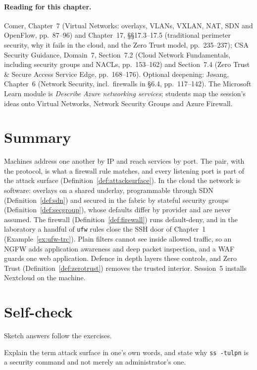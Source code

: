\paragraph{Reading for this chapter.} Comer, Chapter~7 (Virtual Networks:
overlays, VLANs, VXLAN, NAT, SDN and OpenFlow, pp.~87--96) and Chapter~17,
\S\S17.3--17.5 (traditional perimeter security, why it fails in the cloud, and
the Zero Trust model, pp.~235--237); CSA Security Guidance, Domain~7,
Section~7.2 (Cloud Network Fundamentals, including security groups and NACLs,
pp.~153--162) and Section~7.4 (Zero Trust \& Secure Access Service Edge,
pp.~168--176). Optional deepening: J\o sang, Chapter~6 (Network Security, incl.\ firewalls in \S6.4, pp.~117--142). The
Microsoft Learn module is \emph{Describe Azure networking services}; students
map the session's ideas onto Virtual Networks, Network Security Groups and
Azure Firewall.

\section{Summary}

Machines address one another by IP and reach services by port. The pair,
with the protocol, is what a firewall rule matches, and every listening port
is part of the attack surface (Definition~\ref{def:attacksurface}). In the
cloud the network is software: overlays on a shared underlay, programmable
through SDN (Definition~\ref{def:sdn}) and secured in the fabric by stateful
security groups (Definition~\ref{def:secgroup}), whose defaults differ by
provider and are never assumed. The firewall (Definition~\ref{def:firewall})
runs default-deny, and in the laboratory a handful of \texttt{ufw} rules
close the SSH door of Chapter~1 (Example~\ref{ex:ufw-trc}). Plain filters
cannot see inside allowed traffic, so an NGFW adds application awareness and
deep packet inspection, and a WAF guards one web application. Defence in
depth layers these controls, and Zero Trust (Definition~\ref{def:zerotrust})
removes the trusted interior. Session~5 installs Nextcloud on the machine.

\section*{Self-check}

Sketch answers follow the exercises.

\begin{exercise}
Explain the term attack surface in one's own words, and state why
\texttt{ss -tulpn} is a security command and not merely an administrator's
one.
\end{exercise}

